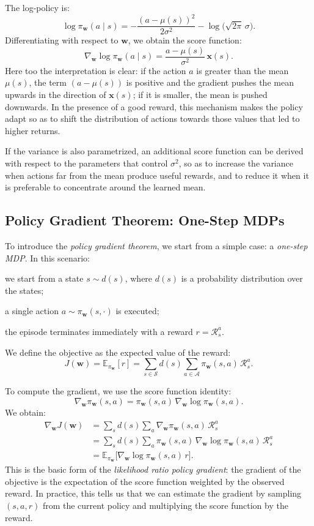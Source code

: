 The log-policy is:
\[
\log \pi_{\mathbf{w}}(a \mid s)
= -\frac{(a - \mu(s))^2}{2\sigma^2} - \log\big(\sqrt{2\pi}\,\sigma\big).
\]
Differentiating with respect to $\mathbf{w}$, we obtain the score function:
\[
\nabla_{\mathbf{w}} \log \pi_{\mathbf{w}}(a \mid s)
= \frac{a - \mu(s)}{\sigma^2}\, \mathbf{x}(s).
\]
Here too the interpretation is clear: if the action $a$ is greater than the mean $\mu(s)$, the term $(a - \mu(s))$ is positive and the gradient pushes the mean upwards in the direction of $\mathbf{x}(s)$; if it is smaller, the mean is pushed downwards. In the presence of a good reward, this mechanism makes the policy adapt so as to shift the distribution of actions towards those values that led to higher returns.

If the variance is also parametrized, an additional score function can be derived with respect to the parameters that control $\sigma^2$, so as to increase the variance when actions far from the mean produce useful rewards, and to reduce it when it is preferable to concentrate around the learned mean.

\subsection{Policy Gradient Theorem: One-Step MDPs}

To introduce the \emph{policy gradient theorem}, we start from a simple case: a \emph{one-step MDP}. In this scenario:
\begin{compactitemize}
    \item we start from a state $s \sim d(s)$, where $d(s)$ is a probability distribution over the states;
    \item a single action $a \sim \pi_{\mathbf{w}}(s,\cdot)$ is executed;
    \item the episode terminates immediately with a reward $r = \mathcal{R}_s^a$.
\end{compactitemize}
We define the objective as the expected value of the reward:
\[
J(\mathbf{w}) = \mathbb{E}_{\pi_{\mathbf{w}}}[r]
= \sum_{s \in \mathcal{S}} d(s) \sum_{a \in \mathcal{A}} \pi_{\mathbf{w}}(s,a)\, \mathcal{R}_s^a.
\]

To compute the gradient, we use the score function identity:
\[
\nabla_{\mathbf{w}} \pi_{\mathbf{w}}(s,a)
= \pi_{\mathbf{w}}(s,a)\, \nabla_{\mathbf{w}} \log \pi_{\mathbf{w}}(s,a).
\]
We obtain:
\[
\begin{aligned}
\nabla_{\mathbf{w}} J(\mathbf{w})
&= \sum_{s} d(s) \sum_{a} \nabla_{\mathbf{w}} \pi_{\mathbf{w}}(s,a)\, \mathcal{R}_s^a \\
&= \sum_{s} d(s) \sum_{a} \pi_{\mathbf{w}}(s,a)\, \nabla_{\mathbf{w}} \log \pi_{\mathbf{w}}(s,a)\, \mathcal{R}_s^a \\
&= \mathbb{E}_{\pi_{\mathbf{w}}}\big[\nabla_{\mathbf{w}} \log \pi_{\mathbf{w}}(s,a)\, r\big].
\end{aligned}
\]
This is the basic form of the \emph{likelihood ratio policy gradient}: the gradient of the objective is the expectation of the score function weighted by the observed reward. In practice, this tells us that we can estimate the gradient by sampling $(s,a,r)$ from the current policy and multiplying the score function by the reward.

